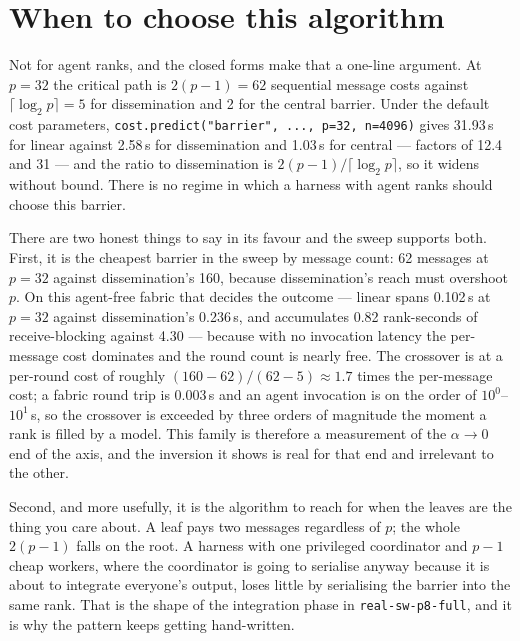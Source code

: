 \documentclass[11pt]{article}
\begin{document}
\section{When to choose this algorithm}

Not for agent ranks, and the closed forms make that a one-line argument. At $p=32$ the critical
path is $2(p-1) = 62$ sequential message costs against $\lceil\log_2 p\rceil = 5$ for
dissemination and 2 for the central barrier. Under the default cost parameters,
\texttt{cost.predict("barrier", ..., p=32, n=4096)} gives 31.93\,s for linear against 2.58\,s
for dissemination and 1.03\,s for central --- factors of 12.4 and 31 --- and the ratio to
dissemination is $2(p-1)/\lceil\log_2 p\rceil$, so it widens without bound. There is no regime
in which a harness with agent ranks should choose this barrier.

There are two honest things to say in its favour and the sweep supports both. First, it is the
cheapest barrier in the sweep by message count: 62 messages at $p=32$ against dissemination's
160, because dissemination's reach must overshoot $p$. On this agent-free fabric that decides
the outcome --- linear spans 0.102\,s at $p=32$ against dissemination's 0.236\,s, and
accumulates 0.82 rank-seconds of receive-blocking against 4.30 --- because with no invocation
latency the per-message cost dominates and the round count is nearly free. The crossover is at a
per-round cost of roughly $(160 - 62)/(62 - 5) \approx 1.7$ times the per-message cost; a fabric
round trip is 0.003\,s and an agent invocation is on the order of $10^0$--$10^1$\,s, so the
crossover is exceeded by three orders of magnitude the moment a rank is filled by a model. This
family is therefore a measurement of the $\alpha \to 0$ end of the axis, and the inversion it
shows is real for that end and irrelevant to the other.

Second, and more usefully, it is the algorithm to reach for when the leaves are the thing you
care about. A leaf pays two messages regardless of $p$; the whole $2(p-1)$ falls on the root. A
harness with one privileged coordinator and $p-1$ cheap workers, where the coordinator is going
to serialise anyway because it is about to integrate everyone's output, loses little by
serialising the barrier into the same rank. That is the shape of the integration phase in
\texttt{real-sw-p8-full}, and it is why the pattern keeps getting hand-written.
\end{document}

